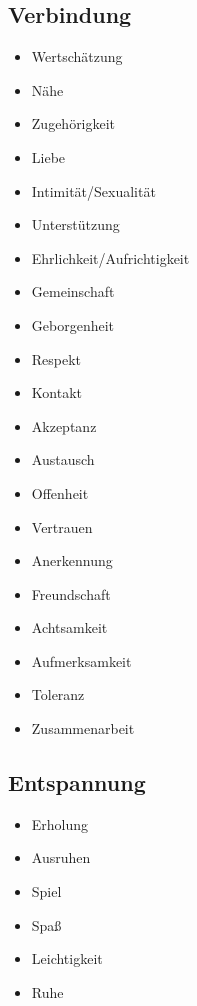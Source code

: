 \subsection{Verbindung}

\begin{multicols}{2}
  \begin{itemize}
    \item Wertschätzung
    \item Nähe
    \item Zugehörigkeit
    \item Liebe
    \item Intimität/Sexualität
    \item Unterstützung
    \item Ehrlichkeit/Aufrichtigkeit
    \item Gemeinschaft
    \item Geborgenheit
    \item Respekt
    \item Kontakt
    \item Akzeptanz
    \item Austausch
    \item Offenheit
    \item Vertrauen
    \item Anerkennung
    \item Freundschaft
    \item Achtsamkeit
    \item Aufmerksamkeit
    \item Toleranz
    \item Zusammenarbeit
  \end{itemize}
\end{multicols}


\subsection{Entspannung}

\begin{multicols}{2}
  \begin{itemize}
    \item Erholung
    \item Ausruhen
    \item Spiel
    \item Spaß
    \item Leichtigkeit
    \item Ruhe
  \end{itemize}
\end{multicols}


